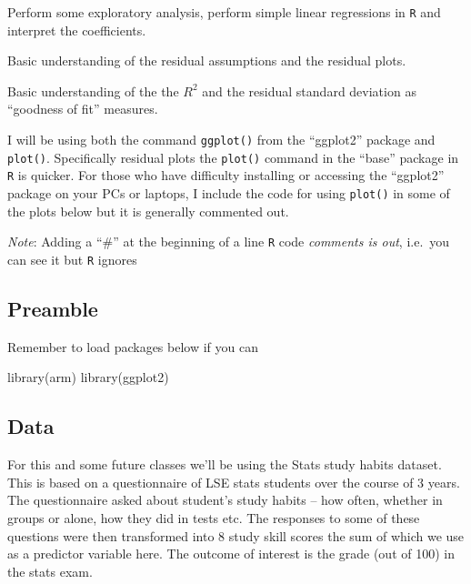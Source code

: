 \documentclass[
]{gitbook}
\newenvironment{Shaded}{\begin{snugshade}}{\end{snugshade}}
\newcommand{\FunctionTok}[1]{\textcolor[rgb]{0.00,0.00,0.00}{#1}}
\newcommand{\NormalTok}[1]{#1}
\begin{document}
Perform some exploratory analysis, perform simple linear regressions in \texttt{R} and interpret the coefficients.

Basic understanding of the residual assumptions and the residual plots.

Basic understanding of the the \(R^2\) and the residual standard deviation as ``goodness of fit'' measures.

I will be using both the command \texttt{ggplot()} from the ``ggplot2'' package and \texttt{plot()}. Specifically residual plots the \texttt{plot()} command in the ``base'' package in \texttt{R} is quicker. For those who have difficulty installing or accessing the ``ggplot2'' package on your PCs or laptops, I include the code for using \texttt{plot()} in some of the plots below but it is generally commented out.

\emph{Note}: Adding a ``\#'' at the beginning of a line \texttt{R} code \emph{comments is out}, i.e.~you can see it but \texttt{R} ignores

\hypertarget{preamble-1}{%
\subsection{Preamble}\label{preamble-1}}

Remember to load packages below if you can

\begin{Shaded}
\begin{Highlighting}[]
\FunctionTok{library}\NormalTok{(arm)}
\FunctionTok{library}\NormalTok{(ggplot2)}
\end{Highlighting}
\end{Shaded}

\hypertarget{data}{%
\subsection{Data}\label{data}}

For this and some future classes we'll be using the Stats study habits dataset. This is based on a questionnaire of LSE stats students over the course of 3 years. The questionnaire asked about student's study habits -- how often, whether in groups or alone, how they did in tests etc. The responses to some of these questions were then transformed into 8 study skill scores the sum of which we use as a predictor variable here. The outcome of interest is the grade (out of 100) in the stats exam.
\end{document}
